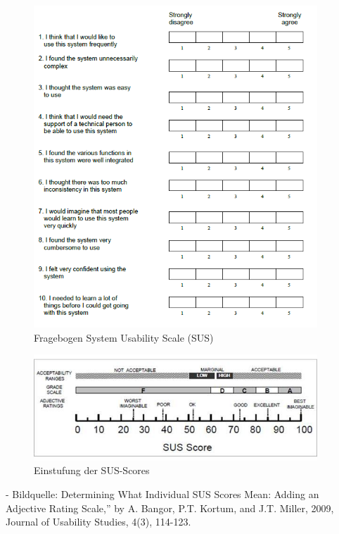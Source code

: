 \begin{figure}[tbh]
    \centering
    \includegraphics[width=0.95\textwidth]{images/SUS.png}
    \caption{Fragebogen System Usability Scale (SUS)}
    \label{fig:SUSFragebogen}
\end{figure}

\begin{figure}[tbh]
    \centering
    \includegraphics[width=0.95\textwidth]{images/SUS-Interpretation.jpg}
    \caption{Einstufung der SUS-Scores}
    \label{fig:susInterpretation}
\end{figure}
- Bildquelle: Determining What Individual SUS Scores Mean: Adding an Adjective Rating Scale,” by A. Bangor, P.T. Kortum, and J.T. Miller, 2009,
Journal of Usability Studies, 4(3), 114-123.

